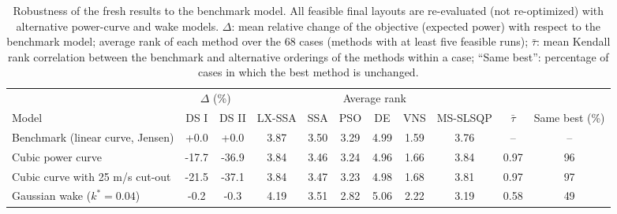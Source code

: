 \begin{table}[!t]
\centering
\caption{Robustness of the fresh results to the benchmark model. All feasible final layouts are re-evaluated (not re-optimized) with alternative power-curve and wake models. $\Delta$: mean relative change of the objective (expected power) with respect to the benchmark model; average rank of each method over the 68 cases (methods with at least five feasible runs); $\bar\tau$: mean Kendall rank correlation between the benchmark and alternative orderings of the methods within a case; ``Same best'': percentage of cases in which the best method is unchanged.}
\label{tab:robust-fresh}
\scriptsize\setlength{\tabcolsep}{3pt}
\begin{tabular}{lcccccccccc}
\toprule
& \multicolumn{2}{c}{$\Delta$ (\%)} & \multicolumn{6}{c}{Average rank} & & \\
\cmidrule(lr){2-3}\cmidrule(lr){4-9}
Model & DS I & DS II & LX-SSA & SSA & PSO & DE & VNS & MS-SLSQP & $\bar\tau$ & Same best (\%) \\
\midrule
Benchmark (linear curve, Jensen) & +0.0 & +0.0 & 3.87 & 3.50 & 3.29 & 4.99 & 1.59 & 3.76 & -- & -- \\
Cubic power curve & -17.7 & -36.9 & 3.84 & 3.46 & 3.24 & 4.96 & 1.66 & 3.84 & 0.97 & 96 \\
Cubic curve with 25 m/s cut-out & -21.5 & -37.1 & 3.84 & 3.47 & 3.23 & 4.98 & 1.68 & 3.81 & 0.97 & 97 \\
Gaussian wake ($k^*=0.04$) & -0.2 & -0.3 & 4.19 & 3.51 & 2.82 & 5.06 & 2.22 & 3.19 & 0.58 & 49 \\
\bottomrule
\end{tabular}
\end{table}
